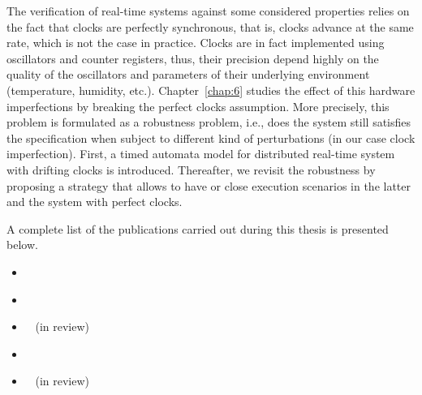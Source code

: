 The verification of real-time systems against some considered properties relies on the fact
that clocks are perfectly synchronous, that is, clocks advance at the same rate, which is not the
case in practice. Clocks are in fact implemented using oscillators and counter registers, thus,
their precision depend highly on the quality of the oscillators and parameters of their 
underlying environment (temperature, humidity, etc.). Chapter~\ref{chap:6} studies the 
effect of this hardware imperfections by breaking the perfect clocks assumption.
More precisely, this problem is formulated as a robustness problem, i.e., does the system
still satisfies the specification when subject to different kind of perturbations (in our case
clock imperfection). First, a timed automata model for distributed real-time system with 
drifting clocks is introduced. Thereafter, we revisit the robustness by proposing a strategy
that allows to have  or close execution scenarios in the latter and the system with 
perfect clocks.

A complete list of the publications carried out during this thesis is presented below.
\begin{itemize}
  \item\cite{fm16}~
  \item\cite{apsec17}~
  \item\cite{lites}~ (in review)
  \item\cite{drift}~ 
  \item\cite{sbip}~ (in review)
\end{itemize}


